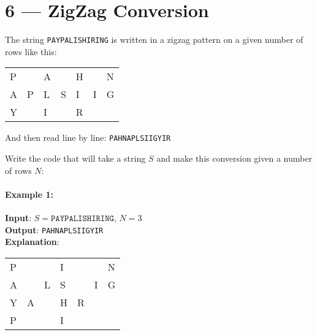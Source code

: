 \section{6 --- ZigZag Conversion}
The string \texttt{PAYPALISHIRING} is written in a zigzag pattern on a given number of rows like this: 
\begin{table}[H]
\begin{tabular}{lllllll}
P &   & A &   & H &   & N \\
A & P & L & S & I & I & G \\
Y &   & I &   & R &   &  
\end{tabular}
\end{table}
And then read line by line: \texttt{PAHNAPLSIIGYIR}
\par
Write the code that will take a string $S$ and make this conversion given a number of rows $N$:
\paragraph{Example 1:}
\begin{flushleft}
\textbf{Input}: $S = \texttt{PAYPALISHIRING}$, $ N = 3$
\\
\textbf{Output}: \texttt{PAHNAPLSIIGYIR}
\\
\textbf{Explanation}:
\end{flushleft}
\begin{table}[H]
\begin{tabular}{lllllll}
P &   &   & I &   &   & N \\
A &   & L & S &   & I & G \\
Y & A &   & H & R &   &   \\
P &   &   & I &   &   &  
\end{tabular}
\end{table}

